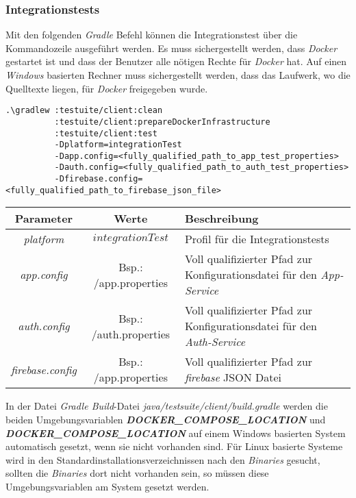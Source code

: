 \documentclass[]{article}
\begin{document}
{{{\subsubsection{Integrationstests}
Mit den folgenden \emph{Gradle} Befehl können die Integrationstest über die Kommandozeile ausgeführt werden. Es muss sichergestellt werden, dass \emph{Docker} gestartet ist und dass der Benutzer alle nötigen Rechte für \emph{Docker} hat. Auf einen \emph{Windows} basierten Rechner muss sichergestellt werden, dass das Laufwerk, wo die Quelltexte liegen, für \emph{Docker} freigegeben wurde. 
\begin{verbatim}
.\gradlew :testuite/client:clean 
          :testuite/client:prepareDockerInfrastructure 
          :testuite/client:test
          -Dplatform=integrationTest
          -Dapp.config=<fully_qualified_path_to_app_test_properties> 
          -Dauth.config=<fully_qualified_path_to_auth_test_properties> 
          -Dfirebase.config=<fully_qualified_path_to_firebase_json_file>
\end{verbatim}
{\renewcommand{\arraystretch}{2}%
\begin{center}
	\begin{tabular}{| c | c | p{8.3cm} |}
		\hline
		\textbf{Parameter} & \textbf{Werte} & \textbf{Beschreibung}  \\ \hline
		\textit{platform} & $integrationTest$ & Profil für die Integrationstests\\ \hline
		\textit{app.config} & Bsp.: /app.properties & Voll qualifizierter Pfad zur Konfigurationsdatei für den \emph{App-Service}  \\ \hline
		\textit{auth.config} & Bsp.: /auth.properties & Voll qualifizierter Pfad zur Konfigurationsdatei für den \emph{Auth-Service}  \\ \hline
		\textit{firebase.config} & Bsp.: /app.properties & Voll qualifizierter Pfad zur 
		\emph{firebase} JSON Datei  \\ \hline
	\end{tabular}
\end{center}
In der Datei \emph{Gradle Build}-Datei \emph{java/testsuite/client/build.gradle} werden die beiden Umgebungsvariablen \textbf{\emph{DOCKER\_COMPOSE\_LOCATION}} und  \textbf{\emph{DOCKER\_COMPOSE\_LOCATION}} auf einem Windows basierten System automatisch gesetzt, wenn sie nicht vorhanden sind. Für Linux basierte Systeme wird in den Standardinstallationsverzeichnissen nach den \emph{Binaries} gesucht, sollten die \emph{Binaries} dort nicht vorhanden sein, so müssen diese Umgebungsvariablen am System gesetzt werden. 
\newpage

}}}}
\end{document}
